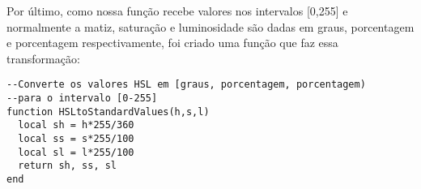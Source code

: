 Por último, como nossa função recebe valores nos intervalos [0,255] e normalmente a matiz, saturação e luminosidade são dadas em graus, porcentagem e porcentagem respectivamente, foi criado uma função que faz essa transformação:

\begin{lstlisting}[language={[5.0]lua}]
--Converte os valores HSL em [graus, porcentagem, porcentagem)
--para o intervalo [0-255]
function HSLtoStandardValues(h,s,l)
  local sh = h*255/360
  local ss = s*255/100
  local sl = l*255/100
  return sh, ss, sl
end
\end{lstlisting}
